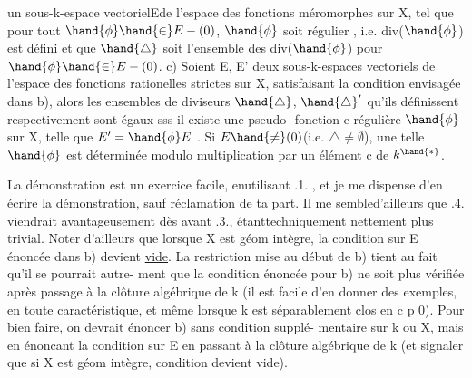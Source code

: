 
un sous-k-espace vectorielEde l'espace des  fonctions  méromorphes  
sur X, tel que pour tout $\hand{\phi} \hand{\in} E-(0)$, $\hand{\phi}$ soit régulier 
  , i.e. div($\hand{\phi}$) est défini 
\hand{\unsure{,|)}} et que $\hand{\triangle}$ soit l'ensemble des div($\hand{\phi}$) pour $\hand{\phi} \hand{\in} E-(0)$.
c) Soient E, E' deux sous-k-espaces vectoriels de l'espace des
fonctions rationelles strictes  sur X,  satisfaisant la condition
envisagée dans b), alors les ensembles de diviseurs $\hand{\triangle}$, $\hand{\triangle}'$ qu'ils
définissent respectivement sont égaux sss il existe une pseudo- fonction
e  régulière $\hand{\phi}$ sur X, telle que $E' = \hand{\phi} E$ . Si $E\hand{\neq}(0)$(i.e. $\triangle \neq \emptyset$), une
telle $\hand{\phi}$ est déterminée modulo multiplication par un élément c de $k^{\hand{*}}$.

La démonstration est un exercice facile, enutilisant .1. , et je
me dispense d'en écrire la démonstration, sauf réclamation de ta part. Il
\placedmargin{||} me sembled'ailleurs que .4. viendrait avantageusement dès avant .3.,
étanttechniquement nettement plus trivial. Noter d'ailleurs que lorsque
X est géom intègre, la condition sur E énoncée dans b) devient \uline{vide}.
La restriction mise au début de b) tient au fait qu'il se pourrait autre-%
ment que la condition énoncée pour b) ne soit plus vérifiée après passage
à la clôture algébrique de k (il est facile d'en donner des exemples,
en toute caractéristique, et même lorsque k est séparablement clos en
c p \hand{$>$} 0). Pour bien faire, on devrait énoncer b) sans condition supplé-%
mentaire sur k ou X, mais en énoncant la condition sur E en passant à la
clôture algébrique de k (et signaler que si X est géom intègre, 
condition devient vide). 

